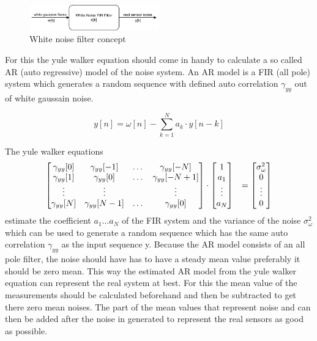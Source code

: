   \begin{figure}[h!]
 \centering
 \includegraphics[width=0.5\textwidth]{./Pictures/WhiteNoiseFilter.pdf}
 \caption{White noise filter concept}
 \label{fig:WhiteNoiseFilter}
\end{figure}
  
  
  For this the yule walker equation should come in handy to calculate a so called AR (auto regressive) model of the noise system.
  An AR model is a FIR (all pole) system which generates a random sequence with defined auto correlation $\gamma_{yy}$ out of white gaussain noise.
  
  $$ y[n] = \omega[n] - \sum_{k=1}^{N} a_k \cdot y[n-k]  $$
  
  The yule walker equations
  \begin{align*}
    \begin{bmatrix}
     \gamma_{yy}[0] & \gamma_{yy}[-1] & \dots & \gamma_{yy}[-N] \\
     \gamma_{yy}[1] & \gamma_{yy}[0] & \dots & \gamma_{yy}[-N+1] \\
     \vdots 		& \vdots 	& 	& \vdots	\\
     \gamma_{yy}[N] & \gamma_{yy}[N-1] & \dots & \gamma_{yy}[0]
    \end{bmatrix}
    & \cdot
    \begin{bmatrix}
     1 \\
     a_1 \\
     \vdots \\
     a_N   
    \end{bmatrix}
    & = 
    \begin{bmatrix}
     \sigma^2_\omega \\
     0 \\
     \vdots \\
     0
    \end{bmatrix}
    \hfill
  \end{align*}
  \hfill
  estimate the coefficient $a_1 \dots a_N $ of the FIR system and the variance of the noise $\sigma^2_\omega $ which can be used to generate a random sequence which has the same auto correlation $\gamma_{yy}$ as the input sequence y.
  Because the AR model consists of an all pole filter, the noise should have has to have a steady mean value preferably it should be zero mean.
  This way the estimated AR model from the yule walker equation can represent the real system at best.
  For this the mean value of the measurements should be calculated beforehand and then be subtracted to get there zero mean noises.
  The part of the mean values that represent noise and can then be added after the noise in generated to represent the real sensors as good as possible.
  
